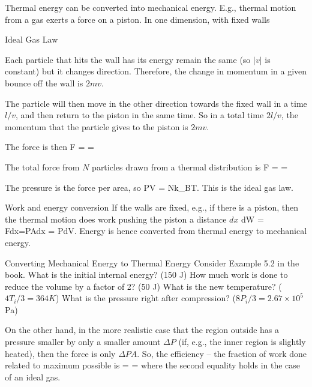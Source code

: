 \documentclass[11pt]{book}
\begin{document}




Thermal energy can be converted into mechanical energy.  E.g., thermal motion from a gas exerts a force on a piston. In one dimension, with fixed walls
\bee 
\item Ideal Gas Law
\bei
\item Each particle that hits the wall has its energy remain the same (so $|v|$ is constant) but it changes direction. Therefore, the change in momentum in a given bounce off the wall is $2mv$. 
\item The particle will then move in the other direction towards the fixed wall in a time $l/v$, and then return to the piston in the same time. So in a total time $2l/v$, the momentum that the particle gives to the piston is $2mv$. 
\item The force is then 
\be F =  = 
\ee
\item The total force from $N$ particles drawn from a thermal distribution is
\be
F =  = 
\ee
\item The pressure is the force per area, so
\be
PV = Nk_BT.
\ee
\eei
This is the ideal gas law.
\item Work and energy conversion
If the walls are fixed, e.g., if there is a piston, then the thermal motion does work pushing the piston a distance $dx$
\be
dW = Fdx=PAdx = PdV.\ee
Energy is hence converted from thermal energy to mechanical energy.
\item Converting Mechanical Energy to Thermal Energy
Consider Example 5.2 in the book. 
 What is the initial internal energy? (150 J)
How much work is done to reduce the volume by a factor of 2? (50 J)
What is the new temperature? ($4T_i/3=364K$)
What is the pressure right after compression? ($8P_i/3=2.67\times 10^5$Pa)
\item 
On the other hand, in the more realistic case that the region outside has a pressure smaller by only a smaller amount $\Delta P$ (if, e.g., the inner region is slightly heated), then the force is only $\Delta P A$. So, the efficiency -- the fraction of work done related to maximum possible is
\be
\eta =  = 
\ee
where the second equality holds in the case of an ideal gas.
\eee
\end{document}
